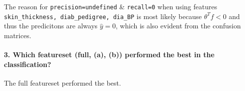 \documentclass[11pt]{article}
\makeatletter
\def\lt{<}
\newcommand{\boxspacing}{\kern\kvtcb@left@rule\kern\kvtcb@boxsep}
\newcommand{\prompt}[4]{
        \ttfamily\llap{{\color{#2}[#3]:\hspace{3pt}#4}}\vspace{-\baselineskip}
    }
\makeatother
\begin{document}
The reason for \texttt{precision=undefined} \& \texttt{recall=0} when
using features \texttt{skin\_thickness,\ diab\_pedigree,\ dia\_BP} is
most likely because \(\theta^Tf\lt0\) and thus the predicitons are
always \(\hat{y} = 0\), which is also evident from the confusion
matrices.

\hypertarget{which-featureset-full-a-b-performed-the-best-in-the-classification}{%
\paragraph{3. Which featureset (full, (a), (b)) performed the best in
the
classification?}\label{which-featureset-full-a-b-performed-the-best-in-the-classification}}

The full featureset performed the best.

    \begin{tcolorbox}[breakable, size=fbox, boxrule=1pt, pad at break*=1mm,colback=cellbackground, colframe=cellborder]
\prompt{In}{incolor}{ }{\boxspacing}
\begin{Verbatim}[commandchars=\\\{\}]

\end{Verbatim}
\end{tcolorbox}


    
    
    
\end{document}
